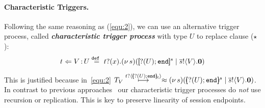 \paragraph{Characteristic Triggers.}
Following the same reasoning as (\ref{equ:2}), 
we can use an alternative trigger process, called
{\bf\em characteristic trigger process} with type 
$U$ to replace clause
($\star$): %
\begin{equation}
	\label{eq:4}
	 {
	~~t \Leftarrow V{\,:\,}U \stackrel{\mathtt{def}\ }{=}t ?(x) .(\nu\, s)([\!\![?(U) ;\mathtt{end}]\!\!]^{s} \;|\;\overline{s} !\langle V \rangle .\mathbf{0})~~
	}
\end{equation}

\noi
This is justified because in~\eqref{equ:2} $T_V \hby{\bactinp{t}{\omapchar{\btinp{U} \tinact}}} \wbc \newsp{s}{\mapchar{\btinp{U} \tinact}{s} \Par \bout{\dual{s}}{V} \inact }$.
\noi 
{}
In contrast to previous approaches~\cite{SangiorgiD:expmpa,JeffreyR05} 
our %
 characteristic trigger processes 
do {\em not} use recursion or 
replication. This is key to preserve linearity of session endpoints.  


\begin{comment}
\myparagraph{Refined Input Transitions.}
Based on 
the above discussion, we refine 
the (early) transition rule for input actions. 
The refined transition rule for input roughly becomes 
(see \defref{def:rlts} for details):
$$
\boxed{
~~P \by{\bactinp{n}{V}} P' ~\land~ (V = m \vee V \scong \abs{{x}}{\binp{t}{y} (\appl{y}{{x}})} \vee  V \scong \omapchar{U}  \textrm{ with } t \textrm{ fresh}) ~~\Rightarrow~~
P' \hby{\bactinp{n}{V}} P'~~}
$$
\noi
Thus, our refined LTS admits only names, trigger values, and characteristic values in inputs.
Note the distinction between standard and refined transitions: $\by{\bactinp{n}{V}}$ vs. $\hby{\bactinp{n}{V}}$.
Using this rule, we define an alternative  LTS
with refined 
\jpc{(higher-order)}
input. %
This refined LTS is used for 
characteristic  bisimulation 
($\fwb$, Def.~\ref{d:fwb}),
in which the demanding clause~$(\star)$ is replaced with 
a more tractable output clause based on 
characteristic 
trigger processes
\jpc{(cf.~\eqref{eq:4})}.
\end{comment}

